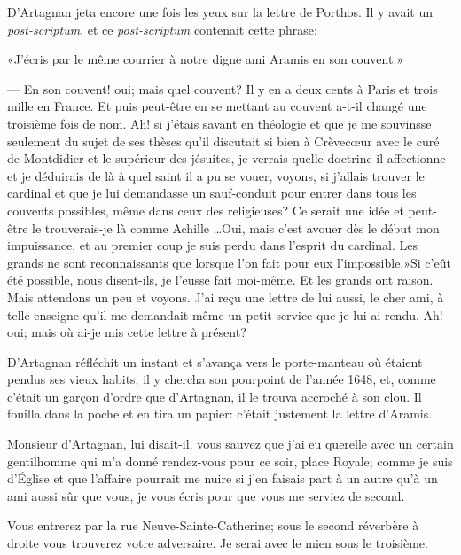 D'Artagnan jeta encore une fois les yeux sur la lettre de Porthos. Il y avait un \textit{post-scriptum}, et ce \textit{post-scriptum} contenait cette phrase:

«J'écris par le même courrier à notre digne ami Aramis en son couvent.»

— En son couvent! oui; mais quel couvent? Il y en a deux cents à Paris et trois mille en France. Et puis peut-être en se mettant au couvent a-t-il changé une troisième fois de nom. Ah! si j'étais savant en théologie et que je me souvinsse seulement du sujet de ses thèses qu'il discutait si bien à Crèvecœur avec le curé de Montdidier et le supérieur des jésuites, je verrais quelle doctrine il affectionne et je déduirais de là à quel saint il a pu se vouer, voyons, si j'allais trouver le cardinal et que je lui demandasse un sauf-conduit pour entrer dans tous les couvents possibles, même dans ceux des religieuses? Ce serait une idée et peut-être le trouverais-je là comme Achille \dots Oui, mais c'est avouer dès le début mon impuissance, et au premier coup je suis perdu dans l'esprit du cardinal. Les grands ne sont reconnaissants que lorsque l'on fait pour eux l'impossible.»Si c'eût été possible, nous disent-ils, je l'eusse fait moi-même. Et les grands ont raison. Mais attendons un peu et voyons. J'ai reçu une lettre de lui aussi, le cher ami, à telle enseigne qu'il me demandait même un petit service que je lui ai rendu. Ah! oui; mais où ai-je mis cette lettre à présent?

D'Artagnan réfléchit un instant et s'avança vers le porte-manteau où étaient pendus ses vieux habits; il y chercha son pourpoint de l'année 1648, et, comme c'était un garçon d'ordre que d'Artagnan, il le trouva accroché à son clou. Il fouilla dans la poche et en tira un papier: c'était justement la lettre d'Aramis.

\begin{mail}{}{Monsieur d'Artagnan,}
	\pausemail
	lui disait-il, 
	\resumemail
	vous sauvez que j'ai eu querelle avec un certain gentilhomme qui m'a donné rendez-vous pour ce soir, place Royale; comme je suis d'Église et que l'affaire pourrait me nuire si j'en faisais part à un autre qu'à un ami aussi sûr que vous, je vous écris pour que vous me serviez de second.

Vous entrerez par la rue Neuve-Sainte-Catherine; sous le second réverbère à droite vous trouverez votre adversaire. Je serai avec le mien sous le troisième.

\end{mail}

